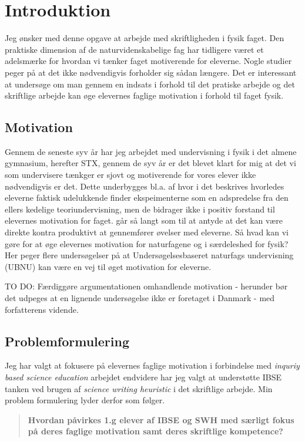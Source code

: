 \chapter{Introduktion}
\label{Ch:1}

Jeg ønsker med denne opgave at arbejde med skriftligheden i fysik faget. Den praktiske dimension af de naturvidenskabelige fag har tidligere været et adelsmærke for hvordan vi tænker faget motiverende for eleverne. Nogle studier peger på at det ikke nødvendigvis forholder sig sådan længere. Det er interessant at undersøge om man gennem en indsats i forhold til det pratiske arbejde og det skriftlige arbejde kan øge elevernes faglige motivation i forhold til faget fysik. 
\section{Motivation}
\label{sec:1.1}
Gennem de seneste syv år har jeg arbejdet med undervisning i fysik i det almene gymnasium, herefter STX, gennem de syv år er det blevet klart for mig at det vi som undervisere tænkger er sjovt og motiverende for vores elever ikke nødvendigvis er det. Dette underbygges bl.a. af \citep{Hodson2008} hvor i det beskrives hvorledes eleverne faktisk udelukkende finder ekspeimenterne som en adspredelse fra den ellers kedelige teoriundervisning, men de bidrager ikke i positiv forstand til elevernes motivation for faget.  \citet[]{Hodson2008} går så langt som til at antyde at det kan være direkte kontra produktivt at gennemfører øvelser med eleverne. Så hvad kan vi gøre for at øge elevernes motivation for naturfagene og i særdeleshed for fysik? Her peger flere undersøgelser på at Undersøgelsesbaseret naturfags undervisning (UBNU) kan være en vej til øget motivation \citep{Krogh2016, Dolin2014} for eleverne. 

{\color{red} TO DO: Færdiggøre argumentationen omhandlende motivation - herunder bør det udpeges at en lignende undersøgelse ikke er foretaget i Danmark - med forfatterens vidende.}


\section{Problemformulering}
\label{sec:1.2}
Jeg har valgt at fokusere på elevernes faglige motivation i forbindelse med  \emph{inquriy based science education} arbejdet endvidere har jeg valgt at understøtte IBSE tanken ved brugen af \emph{science writing heuristic} i det skriftlige arbejde. Min problem formulering lyder derfor som følger.
\begin{quote}
	{\bfseries Hvordan påvirkes 1.g elever af IBSE og SWH med særligt fokus på deres faglige motivation samt deres skriftlige kompetence?}
\end{quote}
 
